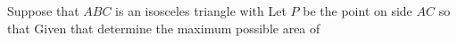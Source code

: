 Suppose that $ ABC$ is an isosceles triangle with  Let $ P$ be the point on side $ AC$ so that  Given that  determine the maximum possible area of 